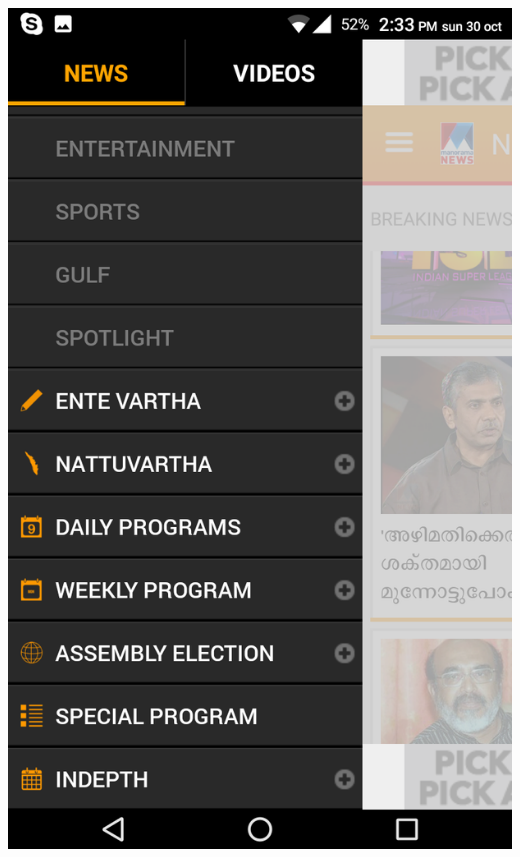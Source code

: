 \documentclass[a4paper, 11pt]{article}
\begin{document}
\includegraphics[scale=0.15]{sd.png}
\end{document}
